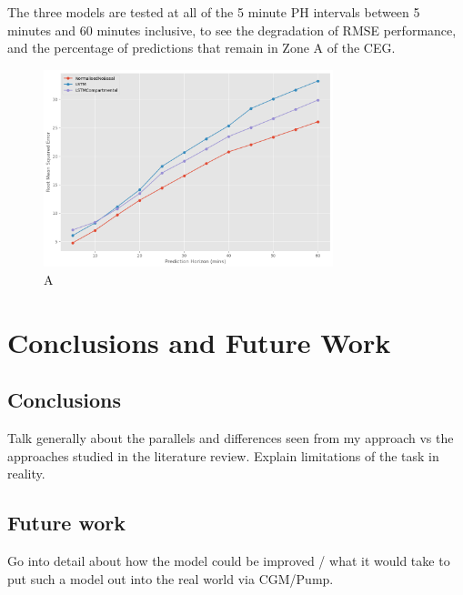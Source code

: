         The three models are tested at all of the 5 minute PH intervals between 5 minutes and 60 minutes inclusive, to see the degradation of RMSE performance, and the percentage of predictions that remain in Zone A of the CEG.

        \begin{figure}[H]
          \centering
    
          \includegraphics[width=0.75\textwidth]{images/AccOverPH.png}
          \caption{
           A 
          }
        \end{figure}



\section{Conclusions and Future Work} %
    \subsection{Conclusions}
        Talk generally about the parallels and differences seen from my approach vs the approaches studied in the literature review. Explain limitations of the task in reality.
	
	\subsection{Future work}
        Go into detail about how the model could be improved / what it would take to put such a model out into the real world via CGM/Pump.
    


\printbibliography[title={References},heading=bibintoc] %



